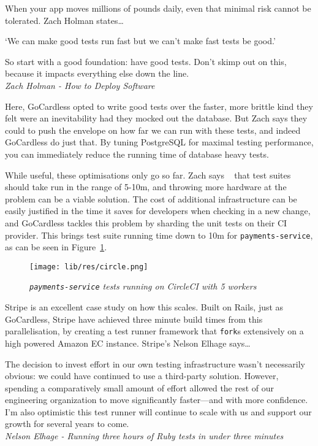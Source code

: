 \documentclass[11pt]{article}
\begin{document}
When your app moves millions of pounds daily, even that minimal risk cannot be
tolerated. Zach Holman states\dots

\begin{displayquote}

  `We can make good tests run fast but we can't make fast tests be good.'

  So start with a good foundation: have good tests. Don't skimp out on this,
  because it impacts everything else down the line. \\

  \textit{Zach Holman - How to Deploy Software~\cite{howToDeploySoftware}}

\end{displayquote}

Here, GoCardless opted to write good tests over the faster, more brittle
kind they felt were an inevitability had they mocked out the database. But Zach
says they could to push the envelope on how far we can run
with these tests, and indeed GoCardless do just that. By tuning PostgreSQL for
maximal testing performance, you can immediately reduce the running time of
database heavy tests.

While useful, these optimisations only go so far. Zach says ~\cite{howToDeploySoftware} that test suites should take run in the
range of 5-10m, and throwing more hardware at the problem can be a viable
solution. The cost of additional infrastructure can be easily justified in the
time it saves for developers when checking in a new change, and GoCardless
tackles this problem by sharding the unit tests on their CI provider. This
brings test suite running time down to 10m for \texttt{payments-service}, as can
be seen in Figure~\ref{fig:circle}.

\begin{figure}
\centering
\texttt{[image: lib/res/circle.png]}
\caption{\label{fig:circle}\textit{\texttt{payments-service} tests running on
CircleCI with 5 workers}}
\end{figure}

Stripe is an excellent case study on how this scales. Built on Rails, 
just as GoCardless, Stripe have achieved three minute build times from 
this parallelisation, by creating a test runner framework that \texttt{fork}s extensively on a
high powered Amazon EC instance. Stripe's Nelson Elhage says\dots

\begin{displayquote}

  The decision to invest effort in our own testing infrastructure wasn't
  necessarily obvious: we could have continued to use a third-party solution.
  However, spending a comparatively small amount of effort allowed the rest of our
  engineering organization to move significantly faster—and with more confidence.
  I'm also optimistic this test runner will continue to scale with us and support
  our growth for several years to come.\\

  \textit{Nelson Elhage - Running three hours of Ruby tests in under three
  minutes~\cite{stripeDistributedTesting}}

\end{displayquote}
\end{document}
